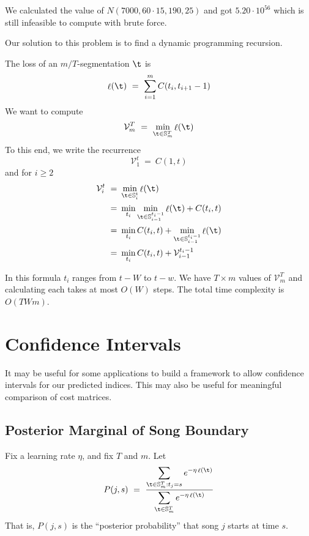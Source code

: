 \documentclass[twocolumn]{article}
\DeclareMathOperator{\loss}{\ell}
\newcommand{\segs}{\mathbb S}
\newcommand{\best}{\mathcal V}
\begin{document}
	We calculated the value of $N(7000,60\cdot15,190,25)$ and got $5.20 \cdot 10^{56}$ which is still infeasible to compute with brute force.
	
	Our solution to this problem is to find a dynamic programming recursion.
	
	The loss of an $m/T$-segmentation $\t$ is 
	\[
	\loss(\t) 
	~=~
	\sum_{i=1}^m C(t_i, t_{i+1}-1)
	\]
	We want to compute
	\[
	\best^T_m ~=~ \min_{\t \in \segs^T_m} \loss(\t)
	\]
	To this end, we write the recurrence
	\begin{equation*}
		\best^t_1 ~=~ C(1, t) 
	\end{equation*}
	and for $i\ge2$
\begin{align*}
		\best^t_i ~=~& \min_{\t \in \segs^t_i} \loss(\t)  \\
		~=~& \min_{t_i} \min_{\t \in \segs^{t_i-1}_{i-1}} \loss(\t) + C(t_i, t)  \\
		~=~&  	\min_{t_i} C(t_i, t) + \min_{\t \in \segs^{t_i-1}_{i-1}} \loss(\t)  \\ 
		~=~& \min_{t_i} C(t_i, t) + \best^{t_i-1}_{i-1} \\
\end{align*}
	
	In this formula $t_i$ ranges from $t-W$ to $t-w$. We have $T \times m$ values of $\best^T_m$ and calculating each takes at most $O(W)$ steps. The total time complexity is $O(TWm)$.
	
\section{Confidence Intervals}\label{sec:confidence-intervals}
	
It may be useful for some applications to build a framework to allow confidence intervals for our predicted indices. This may also be useful for meaningful comparison of cost matrices.
	
	\subsection{Posterior Marginal of Song Boundary}
	Fix a learning rate $\eta$, and fix $T$ and $m$. Let
	\[
	P(j,s) ~=~ 
	\frac{\displaystyle
		\sum_{\t \in \segs^T_m : t_j = s} e^{- \eta \loss(\t)}
	}{\displaystyle
	\sum_{\t \in \segs^T_m} e^{- \eta \loss(\t)}
}
\]
That is, $P(j,s)$ is the ``posterior probability'' that song $j$ starts at time $s$.
\end{document}

